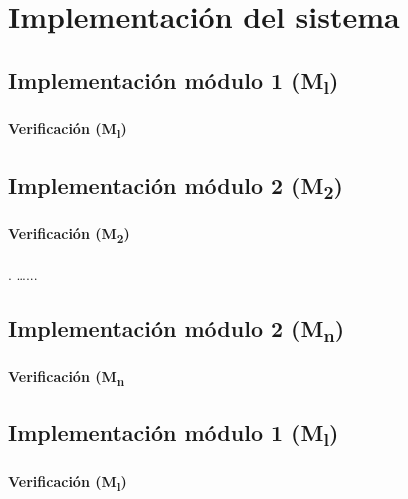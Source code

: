 \chapter{Implementación del sistema}
%
\section{Implementación módulo 1 (M\textsubscript{l})}

\subsubsection{Verificación (M\textsubscript{l})}


\section{Implementación módulo 2 (M\textsubscript{2})}

\subsubsection{Verificación (M\textsubscript{2})}


.  \dots ...
\section{Implementación módulo 2 (M\textsubscript{n})}

\subsubsection{Verificación (M\textsubscript{n}}


\section{Implementación módulo 1 (M\textsubscript{l})}

\subsubsection{Verificación (M\textsubscript{l})}





\endinput 